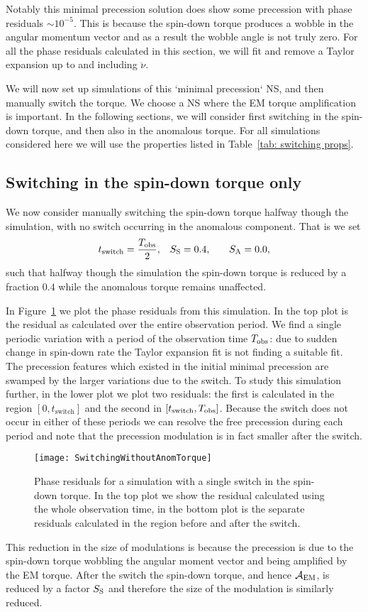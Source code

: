 \documentclass[../full_thesis/full_thesis.tex]{subfiles}
\begin{document}
Notably this minimal precession solution does show some precession with phase
residuals $\sim 10^{-5}$. This is because the spin-down torque produces a wobble
in the angular momentum vector and as a result the wobble angle is not truly
zero. For all the phase residuals calculated in this section, we will fit and
remove a Taylor expansion up to and including $\ddot{\nu}$.

We will now set up simulations of this `minimal precession` NS, and then
manually switch the torque. We choose a NS where the EM torque amplification is
important.  In the following sections, we will consider first switching in the
spin-down torque, and then also in the anomalous torque. For all simulations
considered here we will use the properties listed in Table~\ref{tab: switching
props}.

\subsection{Switching in the spin-down torque only}
We now consider manually switching the spin-down torque halfway though the
simulation, with no switch occurring in the anomalous component.
That is we set
\begin{align}
    t_{\mathrm{switch}} = \frac{T_{\textrm{obs}}}{2}, &&& S_{\mathrm{S}} = 0.4, &&& S_{\mathrm{A}} = 0.0,
\end{align}
such that halfway though the simulation the spin-down torque is reduced by a
fraction $0.4$ while the anomalous torque remains unaffected.

In Figure~\ref{fig: switching without anom} we plot the phase residuals from
this simulation. In the top plot is the residual as calculated over the entire
observation period. We find a single periodic variation with a period of the
observation time $T_{\textrm{obs}}$: due to sudden change in spin-down rate the Taylor
expansion fit is not finding a suitable fit. The precession features which
existed in the initial minimal precession are swamped by the larger variations
due to the switch. To study this simulation further, in the lower plot we plot
two residuals: the first is calculated in the region $[0, t_{\mathrm{switch}}]$
and the second in $[t_{\mathrm{switch}}, T_{\textrm{obs}}]$. Because the switch does not
occur in either of these periods we can resolve the free precession during each
period and note that the precession modulation is in fact smaller after the
switch.
\begin{figure}[htb]
\texttt{[image: SwitchingWithoutAnomTorque]}
\caption{Phase residuals for a simulation with a single switch in the spin-down
torque. In the top plot we show the residual calculated using the whole observation
time, in the bottom plot is the separate residuals calculated in the region before
and after the switch.}
\label{fig: switching without anom}
\end{figure}
This reduction in the size of modulations is because the precession is due to
the spin-down torque wobbling the angular moment vector and being amplified by
the EM torque. After the switch the spin-down torque, and hence $\mathcal{A}_{\mathrm{EM}}$, is
reduced by a factor $S_{\mathrm{S}}$ and therefore the size of the modulation is similarly
reduced.
\end{document}
